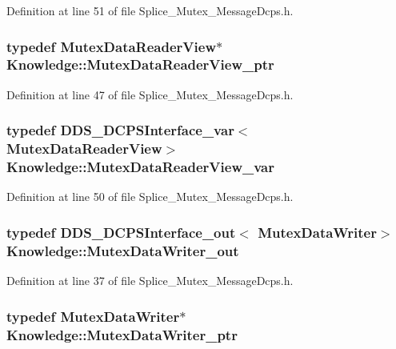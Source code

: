 Definition at line 51 of file Splice\_\-Mutex\_\-MessageDcps.h.

\hypertarget{namespaceKnowledge_a9a97ab51ae7a622b17fcfea9041f92f9}{
\subsubsection[{MutexDataReaderView\_\-ptr}]{\setlength{\rightskip}{0pt plus 5cm}typedef {\bf MutexDataReaderView}$\ast$ {\bf Knowledge::MutexDataReaderView\_\-ptr}}}
\label{da/d50/namespaceKnowledge_a9a97ab51ae7a622b17fcfea9041f92f9}


Definition at line 47 of file Splice\_\-Mutex\_\-MessageDcps.h.

\hypertarget{namespaceKnowledge_ab5f4ad419e160a86a63a5380e0ecaeb9}{
\subsubsection[{MutexDataReaderView\_\-var}]{\setlength{\rightskip}{0pt plus 5cm}typedef DDS\_\-DCPSInterface\_\-var$<$ {\bf MutexDataReaderView}$>$ {\bf Knowledge::MutexDataReaderView\_\-var}}}
\label{da/d50/namespaceKnowledge_ab5f4ad419e160a86a63a5380e0ecaeb9}


Definition at line 50 of file Splice\_\-Mutex\_\-MessageDcps.h.

\hypertarget{namespaceKnowledge_ab75d517dcae365e51d944ebbaaf1a4ab}{
\subsubsection[{MutexDataWriter\_\-out}]{\setlength{\rightskip}{0pt plus 5cm}typedef DDS\_\-DCPSInterface\_\-out$<$ {\bf MutexDataWriter}$>$ {\bf Knowledge::MutexDataWriter\_\-out}}}
\label{da/d50/namespaceKnowledge_ab75d517dcae365e51d944ebbaaf1a4ab}


Definition at line 37 of file Splice\_\-Mutex\_\-MessageDcps.h.

\hypertarget{namespaceKnowledge_a5ae477a56ef6f9ffbcdccd81230f6ec2}{
\subsubsection[{MutexDataWriter\_\-ptr}]{\setlength{\rightskip}{0pt plus 5cm}typedef {\bf MutexDataWriter}$\ast$ {\bf Knowledge::MutexDataWriter\_\-ptr}}}
\label{da/d50/namespaceKnowledge_a5ae477a56ef6f9ffbcdccd81230f6ec2}


